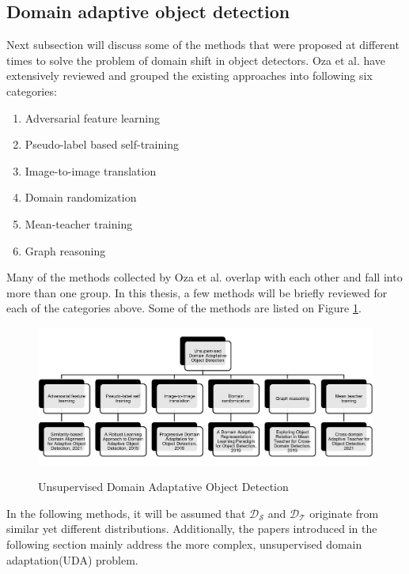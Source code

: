 \documentclass[english, 12pt, a4paper, elec, utf8, a-1b, online]{aaltothesis}
\begin{document}
\subsection{Domain adaptive object detection}

Next subsection will discuss some of the methods that were proposed at different times to solve the problem of domain shift in object detectors. Oza et al. \cite{Oza2021} have extensively reviewed and grouped the existing approaches into following six categories:
\begin{enumerate}
	\item Adversarial feature learning
	\item Pseudo-label based self-training
	\item Image-to-image translation
	\item Domain randomization 
	\item Mean-teacher training
	\item Graph reasoning
\end{enumerate} 

Many of the methods collected by Oza et al. overlap with each other and fall into more than one group. In this thesis, a few methods will be briefly reviewed for each of the categories above. Some of the methods are listed on Figure \ref{UDA_OD}.

\begin{figure}[htb]
	\begin{center}
		\includegraphics[width=16cm]{./UDA_OD.png}
	\end{center}
	\caption{Unsupervised Domain Adaptative Object Detection}
	\begin{center}
		\label{UDA_OD}
	\end{center}
\end{figure}
\FloatBarrier

In the following methods, it will be assumed that $\mathcal{D_S}$ and $\mathcal{D_T}$ originate from similar yet different distributions. Additionally, the papers introduced in the following section mainly address the more complex, unsupervised domain adaptation(UDA) problem.
\end{document}
